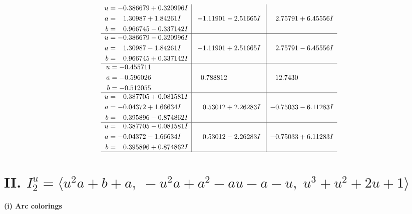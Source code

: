 \documentclass[1p]{elsarticle_modified}
\theoremstyle{definition}
\begin{document}
$$\begin{array}{c|c|c}
\begin{aligned}
u &= -0.386679 + 0.320996 I \\
a &= \phantom{-}1.30987 + 1.84261 I \\
b &= \phantom{-}0.966745 - 0.337142 I\end{aligned}
 & -1.11901 - 2.51665 I & \phantom{-}2.75791 + 6.45556 I \\ \hline\begin{aligned}
u &= -0.386679 - 0.320996 I \\
a &= \phantom{-}1.30987 - 1.84261 I \\
b &= \phantom{-}0.966745 + 0.337142 I\end{aligned}
 & -1.11901 + 2.51665 I & \phantom{-}2.75791 - 6.45556 I \\ \hline\begin{aligned}
u &= -0.455711\phantom{ +0.000000I} \\
a &= -0.596026\phantom{ +0.000000I} \\
b &= -0.512055\phantom{ +0.000000I}\end{aligned}
 & \phantom{-}0.788812\phantom{ +0.000000I} & \phantom{-}12.7430\phantom{ +0.000000I} \\ \hline\begin{aligned}
u &= \phantom{-}0.387705 + 0.081581 I \\
a &= -0.04372 + 1.66634 I \\
b &= \phantom{-}0.395896 - 0.874862 I\end{aligned}
 & \phantom{-}0.53012 + 2.26283 I & -0.75033 - 6.11283 I \\ \hline\begin{aligned}
u &= \phantom{-}0.387705 - 0.081581 I \\
a &= -0.04372 - 1.66634 I \\
b &= \phantom{-}0.395896 + 0.874862 I\end{aligned}
 & \phantom{-}0.53012 - 2.26283 I & -0.75033 + 6.11283 I\\
 \hline 
 \end{array}$$\newpage\newpage\renewcommand{\arraystretch}{1}
\centering \section*{II. $I^u_{2}= \langle u^2 a+b+a,\;- u^2 a+a^2- a u- a- u,\;u^3+u^2+2 u+1 \rangle$}
\flushleft \textbf{(i) Arc colorings}\\
\end{document}
